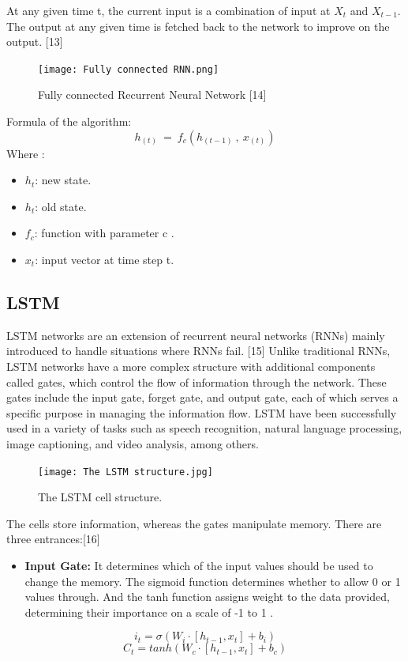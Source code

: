 \documentclass{ieeeojies}
\begin{document}
At any given time t, the current input is a combination of input at \(X_t\) and \(X_{t-1}\). The output at any given time is fetched back to the network to improve on the output. [13]


 \begin{figure}[H]
    \centering
    \begin{minipage}{0.50\textwidth}
    \centering
    \texttt{[image: Fully connected RNN.png]}
    \caption{Fully connected Recurrent Neural Network [14]}
    \label{fig:1}
    \end{minipage}
\end{figure}
Formula of the algorithm:
\[h_{(t)}\ =\ f_c(h_{(t-1)}\ ,\ x_{(t)})\]
Where : 
\begin{itemize}
    \item 	\(h_t\): new state.
\end{itemize}
\begin{itemize}
     \item \(h_t\): old state.
 \end{itemize}
 \begin{itemize}
     \item \(f_c\): function with parameter c .
 \end{itemize}

\begin{itemize}
    \item\(x_t\): input vector at time step t.
\end{itemize}


\subsection{LSTM}
LSTM networks are an extension of recurrent neural networks (RNNs) mainly introduced to handle situations where RNNs fail. [15] Unlike traditional RNNs, LSTM networks have a more complex structure with additional components called gates, which control the flow of information through the network. These gates include the input gate, forget gate, and output gate, each of which serves a specific purpose in managing the information flow. LSTM have been successfully used in a variety of tasks such as speech recognition, natural language processing, image captioning, and video analysis, among others. 
 \begin{figure}[H]
    \centering
    \begin{minipage}{0.50\textwidth}
    \centering
    \texttt{[image: The LSTM structure.jpg]}
    \caption{The LSTM cell structure.}
    \label{fig:1}
    \end{minipage}
\end{figure}
The cells store information, whereas the gates manipulate memory. There are three entrances:[16]
\begin{itemize}
    \item  \textbf{Input Gate:}  It determines which of the input values should be used to change the memory. The sigmoid function determines whether to allow 0 or 1 values through. And the tanh function assigns weight to the data provided, determining their importance on a scale of -1 to 1 . 
\end{itemize}
\[i_t = \sigma(W_i \cdot [h_{t-1}, x_t] + b_i)\]
\[C_t = tanh(W_c \cdot [h_{t-1}, x_t] + b_c)\]
\end{document}
